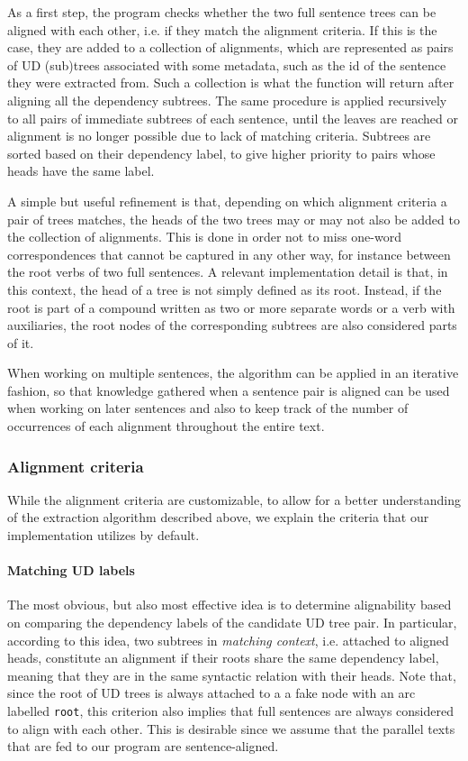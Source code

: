 \documentclass[11pt]{article}
\begin{document}
As a first step, the program checks whether the two full sentence trees can be aligned with each other, i.e. if they match the alignment criteria. 
If this is the case, they are added to a collection of alignments, which are represented as pairs of UD (sub)trees associated with some metadata, such as the id of the sentence they were extracted from.
Such a collection is what the function will return after aligning all the dependency subtrees.
The same procedure is applied recursively to all pairs of immediate subtrees of each sentence, until the leaves are reached or alignment is no longer possible due to lack of matching criteria.
Subtrees are sorted based on their dependency label, to give higher priority to pairs whose heads have the same label.

A simple but useful refinement is that, depending on which alignment criteria a pair of trees matches, the heads of the two trees may or may not also be added to the collection of alignments. 
This is done in order not to miss one-word correspondences that cannot be captured in any other way, for instance between the root verbs of two full sentences.
A relevant implementation detail is that, in this context, the head of a tree is not simply defined as its root. Instead, if the root is part of a compound written as two or more separate words or a verb with auxiliaries, the root nodes of the corresponding subtrees are also considered parts of it.

When working on multiple sentences, the algorithm can be applied in an iterative fashion, so that knowledge gathered when a sentence pair is aligned can be used when working on later sentences and also to keep track of the number of occurrences of each alignment throughout the entire text.

\subsubsection{Alignment criteria} \label{criteria}
While the alignment criteria are customizable, to allow for a better understanding of the extraction algorithm described above, we explain the criteria that our implementation utilizes by default.

\paragraph{Matching UD labels}
The most obvious, but also most effective idea is to determine alignability based on comparing the dependency labels of the candidate UD tree pair. 
In particular, according to this idea, two subtrees in \textit{matching context}, i.e. attached to aligned heads, constitute an alignment if their roots share the same dependency label, meaning that they are in the same syntactic relation with their heads.
Note that, since the root of UD trees is always attached to a a fake node with an arc labelled \texttt{root}, this criterion also implies that full sentences are always considered to align with each other.
This is desirable since we assume that the parallel texts that are fed to our program are sentence-aligned.
\end{document}
